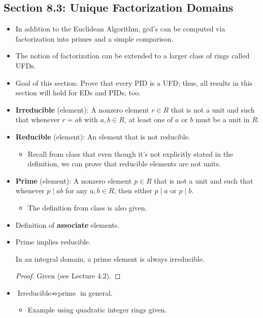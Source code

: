 \documentclass[../notes.tex]{subfiles}
\begin{document}
\subsection*{Section 8.3: Unique Factorization Domains}
\begin{itemize}
    \item {}In addition to the Euclidean Algorithm, gcd's can be computed via factorization into primes and a simple comparison.
    \item The notion of factorization can be extended to a larger class of rings called UFDs.
    \item Goal of this section: Prove that every PID is a UFD; thus, all results in this section will hold for EDs and PIDs, too.
    \item \textbf{Irreducible} (element): A nonzero element $r\in R$ that is not a unit and such that whenever $r=ab$ with $a,b\in R$, at least one of $a$ or $b$ must be a unit in $R$.
    \item \textbf{Reducible} (element): An element that is not reducible.
    \begin{itemize}
        \item Recall from class that even though it's not explicitly stated in the definition, we can prove that reducible elements are not units.
    \end{itemize}
    \item \textbf{Prime} (element): A nonzero element $p\in R$ that is not a unit and such that whenever $p\mid ab$ for any $a,b\in R$, then either $p\mid a$ or $p\mid b$.
    \begin{itemize}
        \item The definition from class is also given.
    \end{itemize}
    \item Definition of \textbf{associate} elements.
    \item Prime implies reducible.
    \begin{proposition}\label{prp:8.10}
        In an integral domain, a prime element is always irreducible.
        \begin{proof}
            Given (see Lecture 4.2).
        \end{proof}
    \end{proposition}
    \item $\text{Irreducible}\nRightarrow\text{prime}$ in general.
    \begin{itemize}
        \item Example using quadratic integer rings given.

\end{itemize}
\end{itemize}
\end{document}
